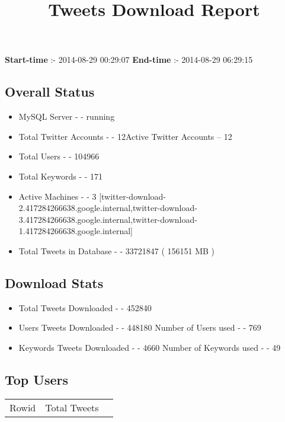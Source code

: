 \documentclass{article}\usepackage[T1]{fontenc}
\begin{document}
\title{\textbf{Tweets Download Report}}
               \date{}
                \maketitle
               \centerline{\textbf{Start-time} :- 2014-08-29 00:29:07 \hspace{40pt} \textbf{End-time} :- 2014-08-29 06:29:15}               \subsection*{Overall Status}                \begin{itemize}                \item MySQL Server - - running               \item Total Twitter Accounts - - 12\newline Active Twitter Accounts -- 12               \item Total Users - - 104966               \item Total Keywords - - 171               \item Active Machines - - 3 [twitter-download-2.417284266638.google.internal,twitter-download-3.417284266638.google.internal,twitter-download-1.417284266638.google.internal]               \item Total Tweets in Database - - 33721847 ( 156151 MB )               \end{itemize}               \subsection*{Download Stats}                \begin{itemize}                \item Total Tweets Downloaded - - 452840               \item Users Tweets Downloaded - - 448180 \newline Number of Users used - - 769               \item Keywords Tweets Downloaded - - 4660 \newline Number of Keywords used - - 49              \end{itemize}              \subsection*{Top Users}\begin{tabular}{|c|c|c|}         \hline         Rowid & Total Tweets \\ 

\end{tabular}
\end{document}
